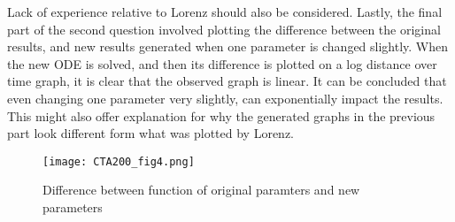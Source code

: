 \documentclass{article}
\begin{document}
Lack of experience relative to Lorenz should also be considered. Lastly, the final part of the second question involved plotting the difference between the original results, and new results generated when one parameter is changed slightly. When the new ODE is solved, and then its difference is plotted on a log distance over time graph, it is clear that the observed graph is linear. It can be concluded that even changing one parameter very slightly, can exponentially impact the results. This might also offer explanation for why the generated graphs in the previous part look different form what was plotted by Lorenz.



\begin{wrapfigure}{r}{0.5\textwidth}
  \centering
  \texttt{[image: CTA200\_fig4.png]}
  \caption{Difference between function of original paramters and new parameters}
\end{wrapfigure}
\end{document}
